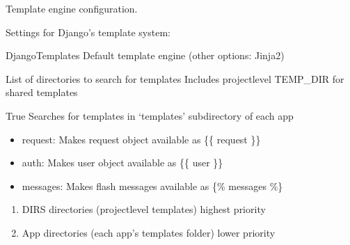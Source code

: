 \documentclass[letterpaper,10pt,english]{sphinxmanual}
\begin{document}
\begin{fulllineitems}
\label{\detokenize{softwareProject:softwareProject.settings.TEMPLATES}}
\pysigstartsignatures
\pysigline
{}
\pysigstopsignatures
\sphinxAtStartPar
Template engine configuration.

\sphinxAtStartPar
Settings for Django’s template system:
\begin{description}
\sphinxAtStartPar
DjangoTemplates \sphinxhyphen{} Default template engine (other options: Jinja2)

\sphinxAtStartPar
List of directories to search for templates
Includes project\sphinxhyphen{}level TEMP\_DIR for shared templates

\sphinxAtStartPar
True \sphinxhyphen{} Searches for templates in ‘templates’ subdirectory of each app

\begin{itemize}
\item {} 
\sphinxAtStartPar
request: Makes request object available as \{\{ request \}\}

\item {} 
\sphinxAtStartPar
auth: Makes user object available as \{\{ user \}\}

\item {} 
\sphinxAtStartPar
messages: Makes flash messages available as \{\% messages \%\}

\end{itemize}

\begin{enumerate}
%
\item {} 
\sphinxAtStartPar
DIRS directories (project\sphinxhyphen{}level templates) \sphinxhyphen{} highest priority

\item {} 
\sphinxAtStartPar
App directories (each app’s templates folder) \sphinxhyphen{} lower priority

\end{enumerate}

\end{description}

\end{fulllineitems}
\end{document}
